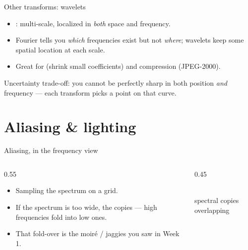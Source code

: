 \documentclass[10pt,aspectratio=169]{beamer}
\begin{document}
\begin{frame}{Other transforms: wavelets}
  \begin{itemize}
    \item {}: multi-scale, localized in \emph{both} space and frequency.
    \item Fourier tells you \emph{which} frequencies exist but not \emph{where}; wavelets keep some
          spatial location at each scale.
    \item Great for  (shrink small coefficients) and compression (JPEG-2000).
  \end{itemize}
  \begin{mathbox}
    Uncertainty trade-off: you cannot be perfectly sharp in both position \emph{and} frequency —
    each transform picks a point on that curve.
  \end{mathbox}
\end{frame}

\section{Aliasing \& lighting}

\begin{frame}{Aliasing, in the frequency view}
  \begin{columns}[T]
    \begin{column}{0.55\textwidth}
      \begin{itemize}
        \item Sampling  the spectrum on a grid.
        \item If the spectrum is too wide, the copies  — high frequencies fold into
              low ones.
        \item That fold-over is the moir\'e / jaggies you saw in Week 1.
      \end{itemize}
    \end{column}
    \begin{column}{0.45\textwidth}\begin{center}
      \\{\scriptsize spectral copies overlapping}
    \end{center}\end{column}
  \end{columns}
\end{frame}
\end{document}
